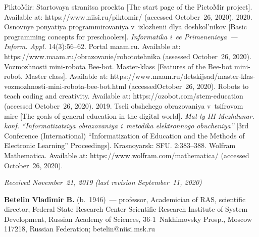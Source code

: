 \begin{multicols}{2}
{{\begin{thebibliography}{99}
PiktoMir: Startovaya stranitsa proekta [The start page of the 
PictoMir project]. Available at: {\sf 
https://www.niisi.\linebreak ru/piktomir/} (accessed October~26, 2020).
 2020. Osnovnye ponyatiya 
programmirovaniya v~iz\-lo\-zhe\-nii dlya doshkol'nikov [Basic programming concepts for preschoolers]. 
\textit{Informatika i~ee Pri\-me\-ne\-nieya~--- Inform. Appl.} 14(3):56--62.
Portal maam.ru. Available at: {\sf  https://www.maam.ru/\linebreak obrazovanie/robototehnika} (assessed 
October~26, 2020).
Vozmozhnosti mini-robota Bee-bot. Master-klass [Features of the Bee-bot mini-robot. Master class]. 
Available at: {\sf https://www.maam.ru/detskijsad/master-klas-vozmozhnosti-mini-robota-bee-bot.html} 
(accessed\linebreak October~26, 2020).
Robots to teach coding and creativity. Available at: {\sf https://ozobot.com/stem-education} (accessed 
October~26, 2020).
 2019. Tseli obshchego obrazovaniya v~tsif\-ro\-vom mire [The goals of general 
education in the digital world]. \textit{Mat-ly III Mezhdunar. konf. ``Informatizatsiya obrazovaniya 
i~metodika elektronnogo obucheniya''} [3rd  Conference (International) ``Informatization of 
Education and the Methods of Electronic Learning'' Proceedings]. Krasnoyarsk: SFU. 2:383--388.
Wolfram Mathematica. Available at: {\sf https://www.\linebreak wolfram.com/mathematica/} (accessed October~26, 
2020).
\end{thebibliography}

 }
 }

\end{multicols}

\vspace*{-3pt}

\hfill{\small\textit{ Received November~21, 2019 (last revision September~11, 
2020)}}





\Contr

\noindent
\textbf{Betelin Vladimir B.} (b.\ 1946)~--- %
professor, 
Academician of RAS, scientific director, Federal State Research Center 
Scientific Research Institute of System 
Development, Russian Academy of Sciences, 36-1~Nakhimovsky Prosp., Moscow 117218, Russian 
Federation; \mbox{betelin@niisi.msk.ru}

